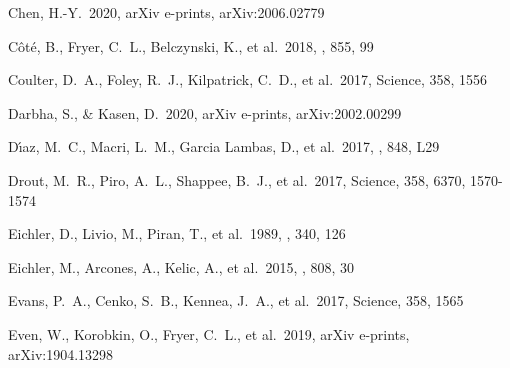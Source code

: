 \documentclass[twocolumn]{aastex63}
\begin{document}
\begin{thebibliography}{}

 Chen, H.-Y.\ 2020, arXiv e-prints, arXiv:2006.02779



 C{\^o}t{\'e}, B., Fryer, C.~L., Belczynski, K., et al.\ 2018, \apj, 855, 99

 Coulter, D.~A., Foley, R.~J., Kilpatrick, C.~D., et al.\ 2017, Science, 358, 1556

 Darbha, S., \& Kasen, D.\ 2020, arXiv e-prints, arXiv:2002.00299

 D{\'\i}az, M.~C., Macri, L.~M., Garcia Lambas, D., et al.\ 2017, \apjl, 848, L29

 Drout, M.~R., Piro, A.~L., Shappee, B.~J., et al.\ 2017, Science, 358, 6370, 1570-1574

 Eichler, D., Livio, M., Piran, T., et al.\ 1989, \nat, 340, 126

 Eichler, M., Arcones, A., Kelic, A., et al.\ 2015, \apj, 808, 30


 Evans, P.~A., Cenko, S.~B., Kennea, J.~A., et al.\ 2017, Science, 358, 1565

 Even, W., Korobkin, O., Fryer, C.~L., et al.\ 2019, arXiv e-prints, arXiv:1904.13298





\end{thebibliography}
\end{document}
